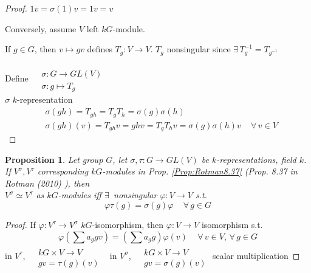\documentclass[10pt]{amsart}
\newtheorem{proposition}{Proposition}
\begin{document}
\begin{multicols*}{2}
\begin{proof}
$1v = \sigma(1) v = 1v = v$

Conversely, assume $V$ left $kG$-module.

If $g \in G$, then $v\mapsto gv$ defines $T_g:V \to V$.  $T_g$ nonsingular since $\exists \, T_g^{-1} = T_{g^{-1}}$

Define $\begin{aligned} & \quad \\
  & \sigma : G \to GL(V) \\
  & \sigma: g \mapsto T_g \end{aligned}$ \quad \\

$\sigma$ $k$-representation
\[
\begin{aligned}
  & \sigma(gh) = T_{gh} = T_g T_h = \sigma(g)\sigma(h) \\
  & \sigma(gh)(v) = T_{gh}v = ghv = T_gT_h v = \sigma(g)\sigma(h)v \quad \, \forall \, v \in V
\end{aligned}
\]

\end{proof}

\begin{proposition}
  Let group $G$, let $\sigma, \tau: G \to GL(V)$ be $k$-representations, field $k$.  \\
If $V^{\sigma}, V^{\tau}$ corresponding $kG$-modules in Prop. \ref{Prop:Rotman8.37} (Prop. 8.37 in Rotman (2010) \cite{JRotman2010}), then \\
$V^{\sigma} \simeq V^{\tau}$ as $kG$-modules iff $\exists \, $ nonsingular $\varphi :V \to V$ s.t. 
\[
\varphi \tau(g) = \sigma(g) \varphi \quad \, \forall \, g \in G
\]

\end{proposition}

\begin{proof}
  If $\varphi : V^{\tau} \to V^{\sigma}$ $kG$-isomorphism, then $\varphi : V \to V$ isomorphism s.t.
\[
\varphi( \sum a_g g v ) = (\sum a_g g)\varphi(v) \quad \, \forall \, v \in V, \, \forall \, g \in G
\]
in $V^{\tau}$, $\begin{aligned} & \quad \\
  & kG \times V \to V \\
  & gv = \tau(g)(v) \end{aligned}$ \quad \quad \, in $V^{\sigma}$, $\begin{aligned} & \quad \\
  & kG \times V \to V \\
  & gv = \sigma(g)(v) \end{aligned}$ scalar multiplication


\end{proof}
\end{multicols*}
\end{document}
